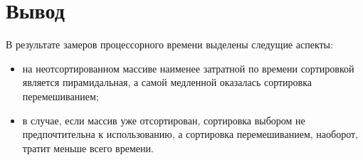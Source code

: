 \FloatBarrier
{}
\FloatBarrier
{}
\FloatBarrier


\section{Вывод}

В результате замеров процессорного времени выделены следущие аспекты:
\begin{itemize}[label=---]
    \item на неотсортированном массиве наименее затратной по времени сортировкой является пирамидальная, а самой медленной оказалась сортировка перемешиванием;
    \item в случае, если массив уже отсортирован, сортировка выбором не предпочтительна к использованию, а сортировка перемешиванием, наоборот, тратит меньше всего времени.
\end{itemize}

